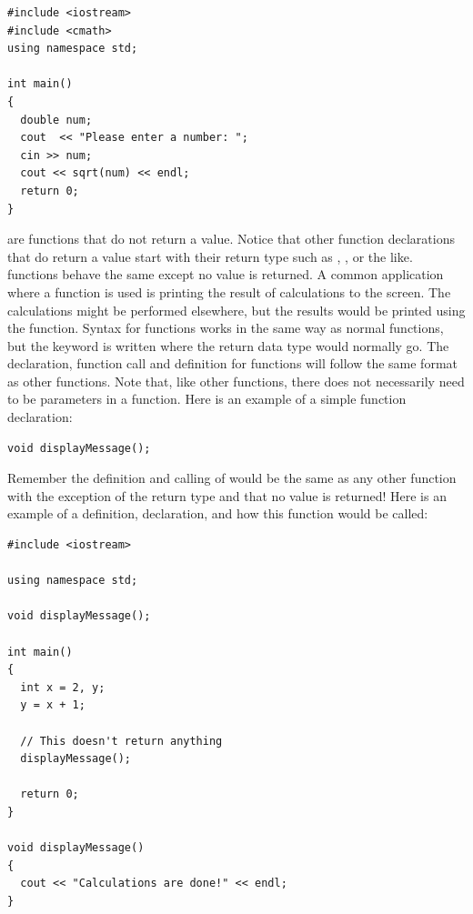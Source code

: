 \noindent\begin{minipage}{\linewidth}\begin{lstlisting}
#include <iostream>
#include <cmath>
using namespace std;
 
int main()
{
  double num;
  cout  << "Please enter a number: ";
  cin >> num;
  cout << sqrt(num) << endl;
  return 0;
}
\end{lstlisting}\end{minipage}
 
 
 are functions that do not return a value. 
Notice that other function declarations that do return a value start with their return type such as , , or the like. 
 functions behave the same except no value is returned. 
A common application where a  function is used is printing the result of calculations to the screen.
The calculations might be performed elsewhere, but the results would be printed using the  function.
Syntax for  functions works in the same way as normal functions, but the keyword  is written where the return data type would normally go. 
The declaration, function call and definition for  functions will follow the same format as other functions. 
Note that, like other functions, there does not necessarily need to be parameters in a  function.
Here is an example of a simple  function declaration:

\noindent\begin{minipage}{\linewidth}\begin{lstlisting}
void displayMessage();
\end{lstlisting}\end{minipage}

Remember the definition and calling of  would be the same as any other function with the exception of the  return type and that no value is returned! 
Here is an example of a definition, declaration, and how this function would be called:

\noindent\begin{minipage}{\linewidth}\begin{lstlisting}
#include <iostream>

using namespace std;

void displayMessage();

int main()
{
  int x = 2, y;
  y = x + 1;
  
  // This doesn't return anything
  displayMessage(); 
  
  return 0;
}

void displayMessage()
{
  cout << "Calculations are done!" << endl;
}
\end{lstlisting}\end{minipage}

